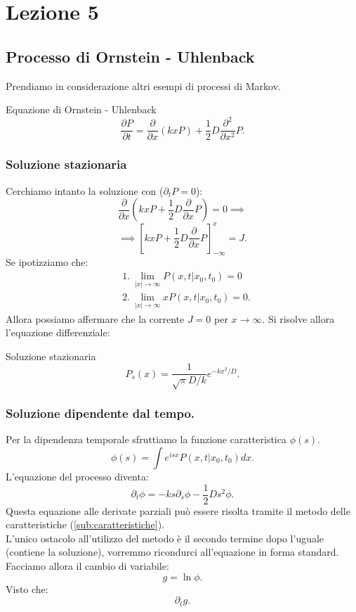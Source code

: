 \section{Lezione 5}%
\label{sub:Lezione 5}
\subsection{Processo di Ornstein - Uhlenback}%
\label{sub:Processo di Ornstein - Uhlenback}
Prendiamo in considerazione altri esempi di processi di Markov.
\begin{redbox}{Equazione di Ornstein - Uhlenback}
    \[
	\frac{\partial P}{\partial t} = \frac{\partial }{\partial x} (kxP) + \frac{1}{2}D\frac{\partial ^2}{\partial x^2} P
    .\] 
\end{redbox}
\noindent
\subsubsection{Soluzione stazionaria}%
\label{subsub:Soluzione stazionaria}
Cerchiamo intanto la soluzione con ($\partial_{t}P=0$):
\[
    \frac{\partial }{\partial x} \left(kxP + \frac{1}{2}D \frac{\partial }{\partial x} P\right) = 0 \implies
\] 
\[
    \implies  \left[kxP + \frac{1}{2}D \frac{\partial }{\partial x} P\right]_{-\infty}^{x} = J
.\] 
Se ipotizziamo che:
\[\begin{aligned}
    & 1. \ \lim_{\left|x\right| \to \infty} P(x, t|x_0,t_0) = 0 \\
    & 2. \ \lim_{\left|x\right| \to \infty} xP(x, t|x_0,t_0) = 0
.\end{aligned}\]
Allora possiamo affermare che la corrente $J=0$ per $x\to \infty$. Si risolve allora l'equazione differenziale:
\begin{bluebox}{Soluzione stazionaria}
    \[
    P_s(x) = \frac{1}{\sqrt{\pi} D /k}e^{-kx^2 / D}
    .\] 
\end{bluebox}
\noindent
\subsubsection{Soluzione dipendente dal tempo.}%
\label{subsub:Soluzione dipendente dal tempo}
Per la dipendenza temporale sfruttiamo la funzione caratteristica $\phi (s)$.
\[
    \phi (s) = \int e^{isx}P(x,t|x_0,t_0) dx
.\] 
L'equazione del processo diventa:
\[
    \partial_{t}\phi  = -ks\partial_{s}\phi  - \frac{1}{2}Ds^2\phi
.\] 
Questa equazione alle derivate parziali può essere risolta tramite il metodo delle caratteristiche (\ref{sub:caratteristiche}).\\
L'unico ostacolo all'utilizzo del metodo è il secondo termine dopo l'uguale (contiene la soluzione), vorremmo ricondurci all'equazione in forma standard. \\
Facciamo allora il cambio di variabile:
\[
    g = \ln\phi 
.\] 
Visto che:
\[
     \partial_{t}g 
.\] 











